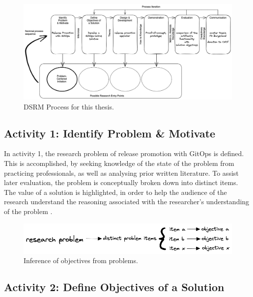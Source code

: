 \begin{figure}[h]
	\centering
	\includegraphics[width=1.00\linewidth]{figures/dsrm-process-release-promotion-gitops.png}
	\caption{DSRM Process for this thesis.
	}
	\label{fig:dsrmProcessReleasePromotionGitOps}	
\end{figure}

\subsection{Activity 1: Identify Problem \& Motivate}
\label{methodology:activity1}

\noindent
In activity 1,
the research problem of
release promotion with GitOps
is defined.
This is accomplished, by
seeking knowledge of the state of the problem
from practicing professionals,
as well as analysing prior written literature.
To assist later evaluation,
the problem is conceptually broken down into distinct items.
The value of a solution is highlighted,
in order to help the audience of the research
understand the reasoning associated with the
researcher's understanding of the problem
\autocite{designScienceResearchMethodologyForInformationSystemsResearch}.
\bigskip

\begin{figure}[h]
	\centering
	\includegraphics[width=0.75\linewidth]{assets/problem-to-objective-mapping.png}
	\caption{Inference of objectives from problems.
	}
	\label{fig:problemToObjectiveMapping}	
\end{figure}

\subsection{Activity 2: Define Objectives of a Solution}
\label{methodology:activity2}

